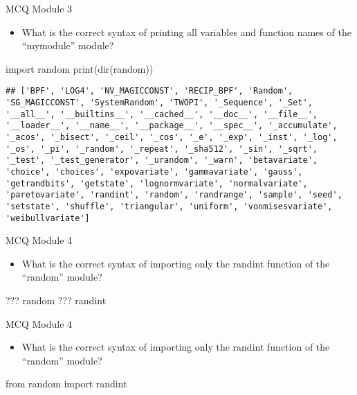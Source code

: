 \documentclass[
  8pt,
  ignorenonframetext,
]{beamer}
\newenvironment{Shaded}{\begin{snugshade}}{\end{snugshade}}
\newcommand{\BuiltInTok}[1]{#1}
\newcommand{\ImportTok}[1]{#1}
\newcommand{\NormalTok}[1]{#1}
\providecommand{\tightlist}{%
  \setlength{\itemsep}{0pt}\setlength{\parskip}{0pt}}
\begin{document}
\begin{frame}[fragile]{MCQ Module 3}
\protect\hypertarget{mcq-module-3-1}{}
\begin{itemize}
\tightlist
\item
  What is the correct syntax of printing all variables and function
  names of the ``mymodule'' module?
\end{itemize}

\begin{Shaded}
\begin{Highlighting}[]
\ImportTok{import}\NormalTok{ random}
\BuiltInTok{print}\NormalTok{(}\BuiltInTok{dir}\NormalTok{(random))}
\end{Highlighting}
\end{Shaded}

\begin{verbatim}
## ['BPF', 'LOG4', 'NV_MAGICCONST', 'RECIP_BPF', 'Random', 'SG_MAGICCONST', 'SystemRandom', 'TWOPI', '_Sequence', '_Set', '__all__', '__builtins__', '__cached__', '__doc__', '__file__', '__loader__', '__name__', '__package__', '__spec__', '_accumulate', '_acos', '_bisect', '_ceil', '_cos', '_e', '_exp', '_inst', '_log', '_os', '_pi', '_random', '_repeat', '_sha512', '_sin', '_sqrt', '_test', '_test_generator', '_urandom', '_warn', 'betavariate', 'choice', 'choices', 'expovariate', 'gammavariate', 'gauss', 'getrandbits', 'getstate', 'lognormvariate', 'normalvariate', 'paretovariate', 'randint', 'random', 'randrange', 'sample', 'seed', 'setstate', 'shuffle', 'triangular', 'uniform', 'vonmisesvariate', 'weibullvariate']
\end{verbatim}
\end{frame}

\begin{frame}[fragile]{MCQ Module 4}
\protect\hypertarget{mcq-module-4}{}
\begin{itemize}
\tightlist
\item
  What is the correct syntax of importing only the randint function of
  the ``random'' module?
\end{itemize}

\begin{Shaded}
\begin{Highlighting}[]
\NormalTok{??? random ??? randint}
\end{Highlighting}
\end{Shaded}
\end{frame}

\begin{frame}[fragile]{MCQ Module 4}
\protect\hypertarget{mcq-module-4-1}{}
\begin{itemize}
\tightlist
\item
  What is the correct syntax of importing only the randint function of
  the ``random'' module?
\end{itemize}

\begin{Shaded}
\begin{Highlighting}[]
\ImportTok{from}\NormalTok{ random }\ImportTok{import}\NormalTok{ randint}
\end{Highlighting}
\end{Shaded}
\end{frame}
\end{document}

